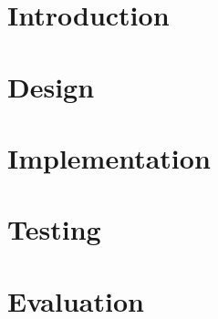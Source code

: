 \documentclass[11pt,a4paper]{article}
\begin{document}



\setlength{\parindent}{0pt}
\setlength{\parskip}{1.5ex plus 0.5ex minus 0.2ex}




\tableofcontents

\pagebreak

\section{Introduction}


\section{Design}


\section{Implementation}


\section{Testing}


\section{Evaluation}


\pagebreak


\end{document}
